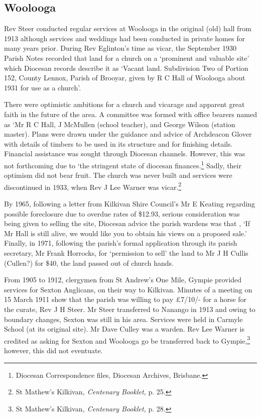 \hypertarget{woolooga}{%
\subsection{Woolooga}\label{woolooga}}

Rev Steer conducted regular services at Woolooga in the original (old)
hall from 1913 although services and weddings had been conducted in
private homes for many years prior. During Rev Eglinton's time as vicar,
the September 1930 Parish Notes recorded that land for a church on a
`prominent and valuable site' which Diocesan records describe it as
`Vacant land. Subdivision Two of Portion 152, County Lennox, Parish of
Brooyar, given by R C Hall of Woolooga about 1931 for use as a church'.

There were optimistic ambitions for a church and vicarage and apparent
great faith in the future of the area. A committee was formed with
office bearers named as `Mr R C Hall, J McMullen (school teacher), and
George Wilson (station master). Plans were drawn under the guidance and
advice of Archdeacon Glover with details of timbers to be used in its
structure and for finishing details. Financial assistance was sought
through Diocesan channels. However, this was not forthcoming due to `the
stringent state of diocesan finances.\footnote{Diocesan Correspondence
  files, Diocesan Archives, Brisbane.} Sadly, their optimism did not
bear fruit. The church was never built and services were discontinued in
1933, when Rev J Lee Warner was vicar.\footnote{St Mathew's
  Kilkivan\emph{, Centenary Booklet,} p. 25.}

By 1965, following a letter from Kilkivan Shire Council's Mr E Keating
regarding possible foreclosure due to overdue rates of \$12.93, serious
consideration was being given to selling the site, Diocesan advice the
parish wardens was that , `If Mr Hall is still alive, we would like you
to obtain his views on a proposed sale.' Finally, in 1971, following the
parish's formal application through its parish secretary, Mr Frank
Horrocks, for `permission to sell' the land to Mr J H Cullis (Cullen?)
for \$40, the land passed out of church hands.

From 1905 to 1912, clergymen from St Andrew's One Mile, Gympie provided
services for Sexton Anglicans, on their way to Kilkivan. Minutes of a
meeting on 15 March 1911 show that the parish was willing to pay £7/10/-
for a horse for the curate, Rev J H Steer. Mr Steer transferred to
Nanango in 1913 and owing to boundary changes, Sexton was still in his
area. Services were held in Carmyle School (at its original site). Mr
Dave Culley was a warden. Rev Lee Warner is credited as asking for
Sexton and Woolooga go be transferred back to Gympie,\footnote{St
  Mathew's Kilkivan\emph{, Centenary Booklet,} p. 28.} however, this did
not eventuate.

